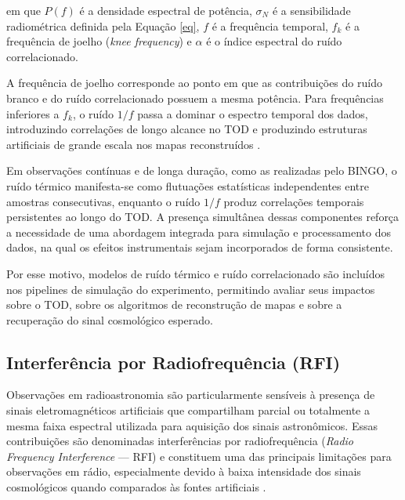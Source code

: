em que \(P(f)\) é a densidade espectral de potência, \(\sigma_N\) é a sensibilidade radiométrica definida pela Equação \ref{eq}, \(f\) é a frequência temporal, \(f_k\) é a frequência de joelho (\textit{knee frequency}) e \(\alpha\) é o índice espectral do ruído correlacionado.

A frequência de joelho corresponde ao ponto em que as contribuições do ruído branco e do ruído correlacionado possuem a mesma potência. Para frequências inferiores a \(f_k\), o ruído \(1/f\) passa a dominar o espectro temporal dos dados, introduzindo correlações de longo alcance no TOD e produzindo estruturas artificiais de grande escala nos mapas reconstruídos \cite{abdalla2022bingoI,guillen2023_bingo}.

Em observações contínuas e de longa duração, como as realizadas pelo BINGO, o ruído térmico manifesta-se como flutuações estatísticas independentes entre amostras consecutivas, enquanto o ruído \(1/f\) produz correlações temporais persistentes ao longo do TOD. A presença simultânea dessas componentes reforça a necessidade de uma abordagem integrada para simulação e processamento dos dados, na qual os efeitos instrumentais sejam incorporados de forma consistente.

Por esse motivo, modelos de ruído térmico e ruído correlacionado são incluídos nos pipelines de simulação do experimento, permitindo avaliar seus impactos sobre o TOD, sobre os algoritmos de reconstrução de mapas e sobre a recuperação do sinal cosmológico esperado.


\subsection{Interferência por Radiofrequência (RFI)}

Observações em radioastronomia são particularmente sensíveis à presença de sinais eletromagnéticos artificiais que compartilham parcial ou totalmente a mesma faixa espectral utilizada para aquisição dos sinais astronômicos. Essas contribuições são denominadas interferências por radiofrequência (\textit{Radio Frequency Interference} — RFI) e constituem uma das principais limitações para observações em rádio, especialmente devido à baixa intensidade dos sinais cosmológicos quando comparados às fontes artificiais \cite{csiro_atnf_spectrum,Pimental2022}.

